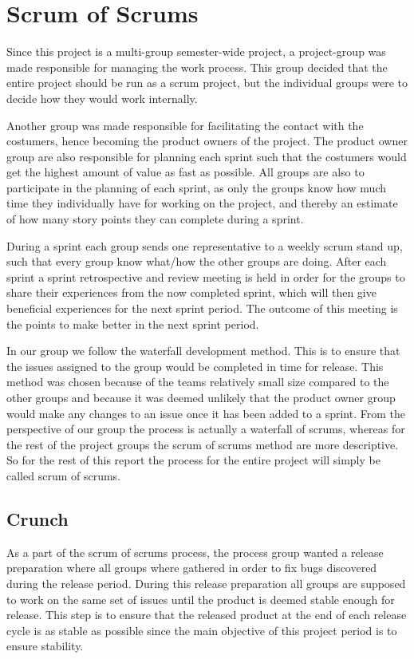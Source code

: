 \section{Scrum of Scrums}
Since this project is a multi-group semester-wide project, a project-group was made responsible for managing the work process.
This group decided that the entire project should be run as a scrum project, but the individual groups were to decide how they would work internally.

Another group was made responsible for facilitating the contact with the costumers, hence becoming the product owners of the project.
The product owner group are also responsible for planning each sprint such that the costumers would get the highest amount of value as fast as possible.
All groups are also to participate in the planning of each sprint, as only the groups know how much time they individually have for working on the project, and thereby an estimate of how many story points they can complete during a sprint.

During a sprint each group sends one representative to a weekly scrum stand up, such that every group know what/how the other groups are doing.
After each sprint a sprint retrospective and review meeting is held in order for the groups to share their experiences from the now completed sprint, which will then give beneficial experiences for the next sprint period.
The outcome of this meeting is the points to make better in the next sprint period.

In our group we follow the waterfall development method. 
This is to ensure that the issues assigned to the group would be completed in time for release. 
This method was chosen because of the teams relatively small size compared to the other groups and because it was deemed unlikely that the product owner group would make any changes to an issue once it has been added to a sprint.
From the perspective of our group the process is actually a waterfall of scrums, whereas for the rest of the project groups the scrum of scrums method are more descriptive.
So for the rest of this report the process for the entire project will simply be called scrum of scrums.

\subsection{Crunch}
As a part of the scrum of scrums process, the process group wanted a release preparation where all groups where gathered in order to fix bugs discovered during the release period. 
During this release preparation all groups are supposed to work on the same set of issues until the product is deemed stable enough for release. 
This step is to ensure that the released product at the end of each release cycle is as stable as possible since the main objective of this project period is to ensure stability.
